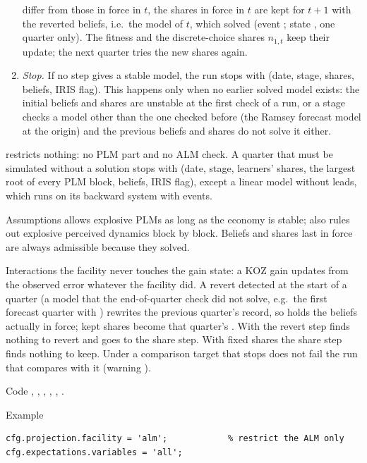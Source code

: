 \documentclass[11pt,a4paper]{article}
\newenvironment{optspec}%
  {\begin{description}[style=sameline,leftmargin=2.7cm,labelwidth=2.5cm,font=\normalfont\itshape]}%
  {\end{description}}
\begin{document}
\begin{optspec}
\begin{enumerate}[nosep,label=(\alph*)]
                differ from those in force in $t$, the shares in force in $t$ are kept for $t+1$
                with the reverted beliefs, i.e.\ the model of $t$, which solved (event
                ; state , one quarter only). The
                fitness and the discrete-choice shares $n_{1,t}$ keep their update; the next
                quarter tries the new shares again.
          \item \emph{Stop.} If no step gives a stable model, the run stops with
                 (date, stage, shares, beliefs, IRIS flag). This
                happens only when no earlier solved model exists: the initial beliefs and shares
                are unstable at the first check of a run, or a stage checks a model other than the
                one checked before (the Ramsey forecast model at the origin) and the previous
                beliefs and shares do not solve it either.
        \end{enumerate}
         restricts nothing: no PLM part and no ALM check. A quarter that must be
        simulated without a solution stops with  (date, stage,
        learners' shares, the largest root of every PLM block, beliefs, IRIS flag), except a
        linear model without leads, which runs on its backward system with 
        events.
  \item[Assumptions]  allows explosive PLMs as long as the economy is stable;
         also rules out explosive perceived dynamics block by block. Beliefs and
        shares last in force are always admissible because they solved.
  \item[Interactions] the facility never touches the gain state: a KOZ gain updates from the
        observed error whatever the facility did. A revert detected at the start of a quarter
        (a model that the end-of-quarter check did not solve, e.g.\ the first forecast quarter
        with ) rewrites the previous quarter's record, so
         holds the beliefs actually in force; kept shares become that
        quarter's . With  the revert step finds
        nothing to revert and goes to the share step. With fixed shares the share step finds
        nothing to keep. Under  a comparison target that stops does not fail the run
        that compares with it (warning ).
  \item[Code] , , ,
        , ,
        .
  \item[Example]
\begin{lstlisting}
cfg.projection.facility = 'alm';            % restrict the ALM only
cfg.expectations.variables = 'all';
\end{lstlisting}
\end{optspec}
\end{document}
